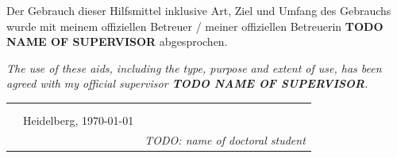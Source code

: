 Der Gebrauch dieser Hilfsmittel inklusive Art, Ziel und Umfang des Gebrauchs wurde mit meinem offiziellen Betreuer / meiner offiziellen Betreuerin \textbf{TODO NAME OF SUPERVISOR} abgesprochen.

\emph{\small\color{dkfzgray2} The use of these aids, including the type, purpose and extent of use, has been agreed with my official supervisor \textbf{TODO NAME OF SUPERVISOR}.}
\newpage


\begin{tabular}{p{3cm}p{5cm}p{4cm}}
      &  & \\
      & & \\
      &Heidelberg, \today & \hrulefill\\
      & & \textit{TODO: name of doctoral student}
\end{tabular}
